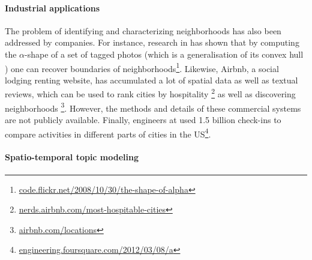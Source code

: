\paragraph{Industrial applications}

The problem of identifying and characterizing neighborhoods has also been
addressed by companies. For instance, research in \flickr{} has shown that by
computing the $\alpha$-shape of a set of tagged photos (which is a
generalisation of its convex hull \autocite{AlphaShape83}) one can recover
boundaries of
neighborhoods\footnote{\href{http://code.flickr.net/2008/10/30/the-shape-of-alpha/}%
{\url{code.flickr.net/2008/10/30/the-shape-of-alpha}}}. Likewise, Airbnb, a
social lodging renting website, has accumulated a lot of spatial data as well
as textual reviews, which can be used to rank cities by hospitality%
\footnote{\href{http://nerds.airbnb.com/most-hospitable-cities/}%
{\url{nerds.airbnb.com/most-hospitable-cities}}} as well as discovering
neighborhoods%
\footnote{\href{https://www.airbnb.com/locations}{\url{airbnb.com/locations}}}.
However, the methods and details of these commercial systems are not publicly
available. Finally, engineers at \fs{} used 1.5 billion check-ins to compare
activities in different parts of cities in
the US\footnote{\href{http://engineering.foursquare.com/2012/03/08/a-hackday-project-what-neighborhood-is-the}%
{\url{engineering.foursquare.com/2012/03/08/a}}}.

\paragraph{Spatio-temporal topic modeling}

